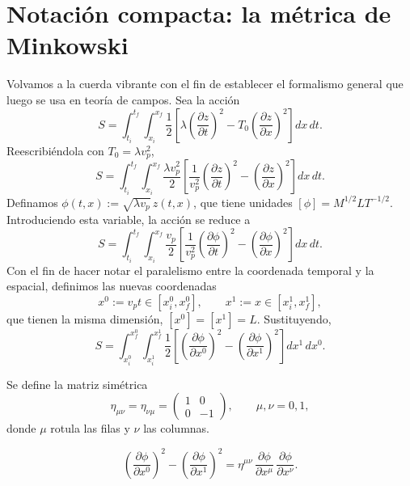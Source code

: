 \section{Notación compacta: la métrica de Minkowski}

Volvamos a la cuerda vibrante con el fin de establecer el formalismo
general que luego se usa en teoría de campos. Sea la acción
\[
S = \int_{t_i}^{t_f}\int_{x_i}^{x_f} \frac12\left[\lambda\left(
\frac{\partial z}{\partial t}\right)^2 - T_0\left(\frac{\partial z}
{\partial x}\right)^2\right] dx\,dt .
\]
Reescribiéndola con $T_0=\lambda v_p^2$,
\[
S = \int_{t_i}^{t_f}\int_{x_i}^{x_f} \frac{\lambda v_p^2}{2}\left[
\frac{1}{v_p^2}\left(\frac{\partial z}{\partial t}\right)^2 -
\left(\frac{\partial z}{\partial x}\right)^2\right] dx\,dt .
\]
Definamos $\phi(t,x) := \sqrt{\lambda v_p}\, z(t,x)$, que tiene unidades
$[\phi] = M^{1/2}LT^{-1/2}$. Introduciendo esta variable, la acción se
reduce a
\[
S = \int_{t_i}^{t_f}\int_{x_i}^{x_f} \frac{v_p}{2}\left[\frac{1}{v_p^2}
\left(\frac{\partial\phi}{\partial t}\right)^2 - \left(\frac{\partial
\phi}{\partial x}\right)^2\right] dx\,dt .
\]
Con el fin de hacer notar el paralelismo entre la coordenada temporal y
la espacial, definimos las nuevas coordenadas
\[
x^0 := v_pt \in [x_i^0,x_f^0], \qquad x^1 := x \in [x_i^1,x_f^1],
\]
que tienen la misma dimensión, $[x^0]=[x^1]=L$. Sustituyendo,
\[
S = \int_{x_i^0}^{x_f^0}\int_{x_i^1}^{x_f^1} \frac12\left[
\left(\frac{\partial\phi}{\partial x^0}\right)^2 - \left(\frac{\partial
\phi}{\partial x^1}\right)^2\right] dx^1\,dx^0 .
\]

\begin{definicion}
Se define la matriz simétrica
\[
\eta_{\mu\nu} = \eta_{\nu\mu} = \begin{pmatrix} 1 & 0 \\ 0 & -1
\end{pmatrix}, \qquad \mu,\nu = 0,1,
\]
donde $\mu$ rotula las filas y $\nu$ las columnas.
\end{definicion}

\begin{proposicionc}
\[
\left(\frac{\partial\phi}{\partial x^0}\right)^2 - \left(\frac{\partial
\phi}{\partial x^1}\right)^2 = \eta^{\mu\nu}\, \frac{\partial\phi}
{\partial x^\mu}\, \frac{\partial\phi}{\partial x^\nu} .
\]
\end{proposicionc}

